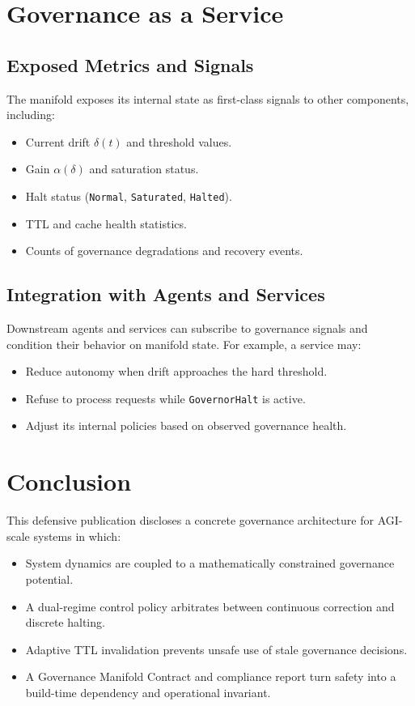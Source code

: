 \documentclass[11pt]{article}
\begin{document}
\section{Governance as a Service}

\subsection{Exposed Metrics and Signals}

The manifold exposes its internal state as first-class signals to other components, including:
\begin{itemize}[noitemsep]
  \item Current drift $\delta(t)$ and threshold values.
  \item Gain $\alpha(\delta)$ and saturation status.
  \item Halt status (\texttt{Normal}, \texttt{Saturated}, \texttt{Halted}).
  \item TTL and cache health statistics.
  \item Counts of governance degradations and recovery events.
\end{itemize}

\subsection{Integration with Agents and Services}

Downstream agents and services can subscribe to governance signals and condition their behavior on manifold state.
For example, a service may:
\begin{itemize}[noitemsep]
  \item Reduce autonomy when drift approaches the hard threshold.
  \item Refuse to process requests while \texttt{GovernorHalt} is active.
  \item Adjust its internal policies based on observed governance health.
\end{itemize}

\section{Conclusion}

This defensive publication discloses a concrete governance architecture for AGI-scale systems in which:
\begin{itemize}[noitemsep]
  \item System dynamics are coupled to a mathematically constrained governance potential.
  \item A dual-regime control policy arbitrates between continuous correction and discrete halting.
  \item Adaptive TTL invalidation prevents unsafe use of stale governance decisions.
  \item A Governance Manifold Contract and compliance report turn safety into a build-time dependency and operational invariant.
\end{itemize}
\end{document}
